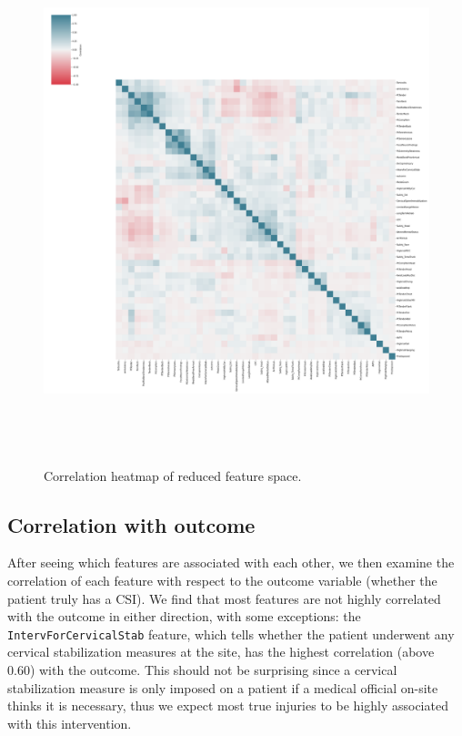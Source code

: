 \documentclass[
]{article}
\begin{document}
\begin{figure}[H]
\includegraphics[height=6in, width=8in]{corr-map.png}
\centering
\caption{Correlation heatmap of reduced feature space.} 
\label{fig:corr-map}
\end{figure}

\hypertarget{sec:corr-out}{%
\subsection{Correlation with outcome}\label{sec:corr-out}}

After seeing which features are associated with each other, we then
examine the correlation of each feature with respect to the outcome
variable (whether the patient truly has a CSI). We find that most
features are not highly correlated with the outcome in either direction,
with some exceptions: the \texttt{IntervForCervicalStab} feature, which
tells whether the patient underwent any cervical stabilization measures
at the site, has the highest correlation (above 0.60) with the outcome.
This should not be surprising since a cervical stabilization measure is
only imposed on a patient if a medical official on-site thinks it is
necessary, thus we expect most true injuries to be highly associated
with this intervention.
\end{document}
